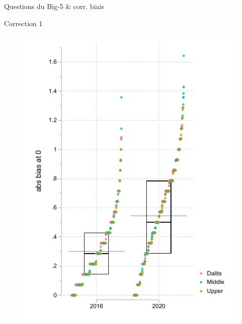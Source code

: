 \documentclass[aspectratio=169]{beamer}
\begin{document}
\begin{frame}[plain, shrink=1]{Questions du Big-5 \& corr. biais}

\end{frame}



\begin{frame}[plain, shrink=2]{Correction 1 \citep{Rammstedt2013}}
\begin{figure}[htpb]
\centering
\includegraphics[scale=1]{INPUT/boxplotars.pdf}
\end{figure}
\end{frame}
\end{document}
